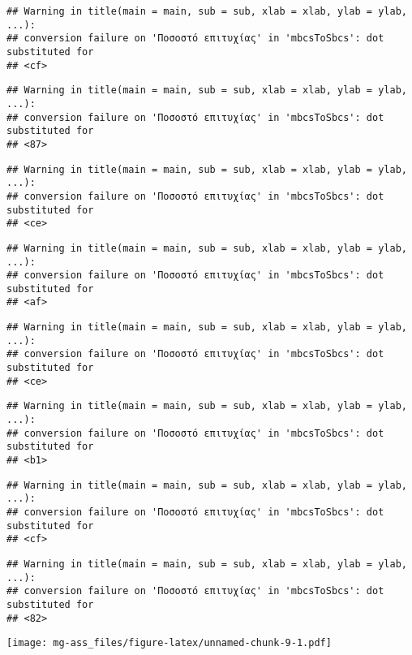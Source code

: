 \documentclass[
]{article}
\begin{document}
\begin{verbatim}
## Warning in title(main = main, sub = sub, xlab = xlab, ylab = ylab, ...):
## conversion failure on 'Ποσοστό επιτυχίας' in 'mbcsToSbcs': dot substituted for
## <cf>
\end{verbatim}

\begin{verbatim}
## Warning in title(main = main, sub = sub, xlab = xlab, ylab = ylab, ...):
## conversion failure on 'Ποσοστό επιτυχίας' in 'mbcsToSbcs': dot substituted for
## <87>
\end{verbatim}

\begin{verbatim}
## Warning in title(main = main, sub = sub, xlab = xlab, ylab = ylab, ...):
## conversion failure on 'Ποσοστό επιτυχίας' in 'mbcsToSbcs': dot substituted for
## <ce>
\end{verbatim}

\begin{verbatim}
## Warning in title(main = main, sub = sub, xlab = xlab, ylab = ylab, ...):
## conversion failure on 'Ποσοστό επιτυχίας' in 'mbcsToSbcs': dot substituted for
## <af>
\end{verbatim}

\begin{verbatim}
## Warning in title(main = main, sub = sub, xlab = xlab, ylab = ylab, ...):
## conversion failure on 'Ποσοστό επιτυχίας' in 'mbcsToSbcs': dot substituted for
## <ce>
\end{verbatim}

\begin{verbatim}
## Warning in title(main = main, sub = sub, xlab = xlab, ylab = ylab, ...):
## conversion failure on 'Ποσοστό επιτυχίας' in 'mbcsToSbcs': dot substituted for
## <b1>
\end{verbatim}

\begin{verbatim}
## Warning in title(main = main, sub = sub, xlab = xlab, ylab = ylab, ...):
## conversion failure on 'Ποσοστό επιτυχίας' in 'mbcsToSbcs': dot substituted for
## <cf>
\end{verbatim}

\begin{verbatim}
## Warning in title(main = main, sub = sub, xlab = xlab, ylab = ylab, ...):
## conversion failure on 'Ποσοστό επιτυχίας' in 'mbcsToSbcs': dot substituted for
## <82>
\end{verbatim}

\texttt{[image: mg-ass\_files/figure-latex/unnamed-chunk-9-1.pdf]}
\end{document}
